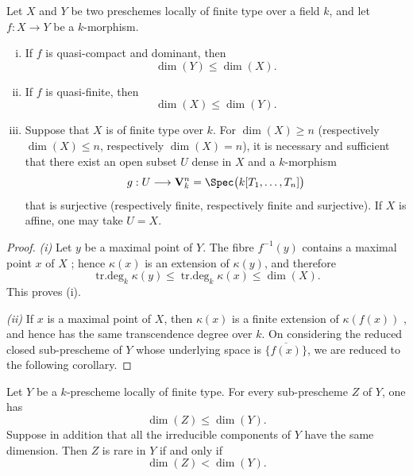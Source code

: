 \begin{theorem}[4.1.2]
\label{IV.4.1.2}
Let $X$ and $Y$ be two preschemes locally of finite type over a field $k$, and let $f:X\to Y$ be a $k$-morphism.


\begin{enumerate}[(i)]
\item If $f$ is quasi-compact and dominant, then
\[
\dim(Y)\leq\dim(X).
\]
\item If $f$ is quasi-finite, then
\[
\dim(X)\leq\dim(Y).
\]
\item Suppose that $X$ is of finite type over $k$.
For $\dim(X)\geq n$ (respectively $\dim(X)\leq n$, respectively $\dim(X)=n$), it is necessary and sufficient that there exist an open subset $U$ dense in $X$ and a $k$-morphism
\[
g:U\longrightarrow\mathbf{V}_k^n
=\Spec\bigl(k[T_1,\ldots,T_n]\bigr)
\]
that is surjective (respectively finite, respectively finite and surjective).
If $X$ is affine, one may take $U=X$.
\end{enumerate}
\end{theorem}

\begin{proof}
\emph{(i)} Let $y$ be a maximal point of $Y$.
The fibre $f^{-1}(y)$ contains a maximal point $x$ of $X$ ; hence $\kappa(x)$ is an extension of $\kappa(y)$, and therefore
\[
\operatorname{tr.deg}_k\kappa(y)
\leq
\operatorname{tr.deg}_k\kappa(x)
\leq
\dim(X).
\]
This proves (i).

\emph{(ii)} If $x$ is a maximal point of $X$, then $\kappa(x)$ is a finite extension of $\kappa(f(x))$ , and hence has the same transcendence degree over $k$.
On considering the reduced closed sub-prescheme of $Y$ whose underlying space is $\overline{\{f(x)\}}$, we are reduced to the following corollary.
\end{proof}

\begin{corollary}[4.1.2.1]
\label{IV.4.1.2.1}
Let $Y$ be a $k$-prescheme locally of finite type.
For every sub-prescheme $Z$ of $Y$, one has
\[
\dim(Z)\leq\dim(Y).
\]
Suppose in addition that all the irreducible components of $Y$ have the same dimension.
Then $Z$ is rare in $Y$ if and only if
\[
\dim(Z)<\dim(Y).
\]
\end{corollary}

